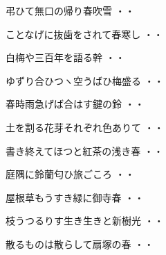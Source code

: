 \vspace{0.6cm}
\begin{shiika}弔ひて無口の帰り春吹雪
\hfill{・・}\end{shiika}
\vspace{0.6cm}
\begin{shiika}ことなげに抜歯をされて春寒し
\hfill{・・}\end{shiika}
\vspace{0.6cm}
\begin{shiika}白梅や三百年を語る幹
\hfill{・・}\end{shiika}
\vspace{0.6cm}
\begin{shiika}ゆずり合ひつヽ空うばひ梅盛る
\hfill{・・}\end{shiika}
\vspace{0.6cm}
\begin{shiika}春時雨急げば合はす鍵の鈴
\hfill{・・}\end{shiika}
\vspace{0.6cm}
\begin{shiika}土を割る花芽それぞれ色ありて
\hfill{・・}\end{shiika}
\vspace{0.6cm}
\begin{shiika}書き終えてほつと紅茶の浅き春
\hfill{・・}\end{shiika}
\vspace{0.6cm}
\begin{shiika}庭隅に鈴蘭匂ひ旅ごころ
\hfill{・・}\end{shiika}
\vspace{0.6cm}
\begin{shiika}屋根草もうすき緑に御寺春
\hfill{・・}\end{shiika}
\vspace{0.6cm}
\begin{shiika}枝うつるりす生き生きと新樹光
\hfill{・・}\end{shiika}
\vspace{0.6cm}
\begin{shiika}散るものは散らして扇塚の春
\hfill{・・}\end{shiika}
